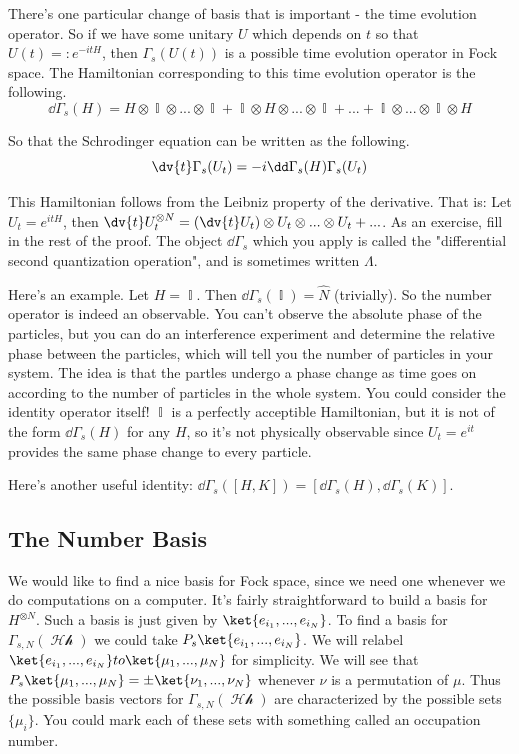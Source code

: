\documentclass{article}
\DeclareMathOperator{\Hh}{\mathcal{Hh}}
\DeclareMathOperator{\II}{\mathbb{I}}
\begin{document}
There's one particular change of basis that is important - the time evolution operator. So if we have some unitary $U$ which depends on $t$ so that $U(t) =: e^{-itH}$, then $\Gamma_s(U(t))$ is a possible time evolution operator in Fock space. The Hamiltonian corresponding to this time evolution operator is the following.
\[\dd\Gamma_s(H) = H\otimes \II \otimes ... \otimes \II + \II \otimes H \otimes ... \otimes \II +...+ \II \otimes ... \otimes \II \otimes H\]

So that the Schrodinger equation can be written as the following.
\begin{equation}
\dv{t}\Gamma_s(U_t) = -i\dd \Gamma_s(H)\Gamma_s(U_t)
\end{equation}

This Hamiltonian follows from the Leibniz property of the derivative. That is: Let $U_t = e^{itH}$, then $\dv{t} U_t^{\otimes N} =  (\dv{t} U_t) \otimes U_t \otimes ... \otimes U_t + ...$. As an exercise, fill in the rest of the proof. The object $\dd \Gamma_s$ which you apply is called the "differential second quantization operation", and is sometimes written $\Lambda$.

Here's an example. Let $H = \II$. Then $\dd \Gamma_s(\II) = \hat N$ (trivially). So the number operator is indeed an observable. You can't observe the absolute phase of the particles, but you can do an interference experiment and determine the relative phase between the particles, which will tell you the number of particles in your system. The idea is that the partles undergo a phase change as time goes on according to the number of particles in the whole system. You could consider the identity operator itself! $\II$ is a perfectly acceptible Hamiltonian, but it is not of the form $\dd \Gamma_s(H)$ for any $H$, so it's not physically observable since $U_t = e^{it}$ provides the same phase change to every particle.

Here's another useful identity: $\dd \Gamma_s([H,K]) = [\dd\Gamma_s(H),\dd\Gamma_s(K)]$.

\subsection{The Number Basis}
We would like to find a nice basis for Fock space, since we need one whenever we do computations on a computer. It's fairly straightforward to build a basis for $H^{\otimes N}$. Such a basis is just given by $\ket{e_{i_1},...,e_{i_N}}$. To find a basis for $\Gamma_{s,N}(\Hh)$ we could take $P_s\ket{e_{i_1},...,e_{i_N}}$. We will relabel $\ket{e_{i_1},...,e_{i_N}} to \ket{\mu_1,...,\mu_N}$ for simplicity. We will see that $P_s \ket{\mu_1,...,\mu_N} = \pm \ket{\nu_1,...,\nu_N}$ whenever $\nu$ is a permutation of $\mu$. Thus the possible basis vectors for $\Gamma_{s,N}(\Hh)$ are characterized by the possible sets $\{\mu_i\}$. You could mark each of these sets with something called an occupation number. 
\end{document}
